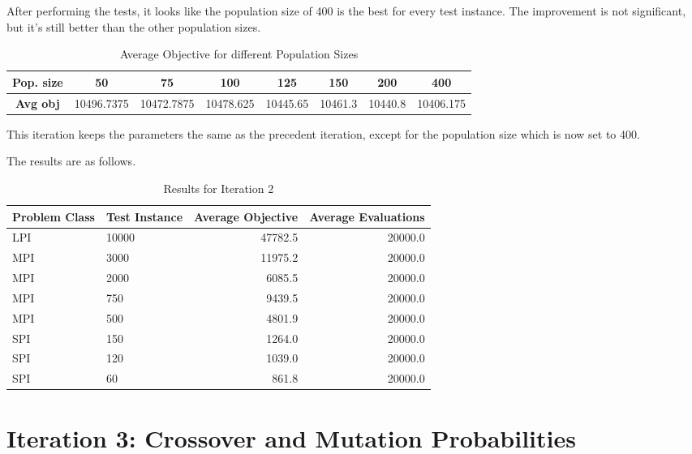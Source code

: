 After performing the tests, it looks like the population size of 400 is the best for every test instance. The improvement is not significant, but it's still better than the other population sizes.

\begin{table}[h!]
    \centering
    \begin{tabular}{|c|c c c c c c c|}
    \hline
    \textbf{Pop. size} & \textbf{50} & \textbf{75} & \textbf{100} & \textbf{125} & \textbf{150} & \textbf{200} & \textbf{400} \\
    \hline
    \textbf{Avg obj} & 10496.7375 & 10472.7875 & 10478.625 & 10445.65 & 10461.3 & 10440.8 & 10406.175 \\
    \hline
    \end{tabular}
    \caption{Average Objective for different Population Sizes}
    \label{table:gen_objective}
\end{table}

This iteration keeps the parameters the same as the precedent iteration, except for the population size which is now set to 400.

The results are as follows.

\begin{table}[h]
    \centering
    \begin{tabular}{|l l r r|}
        \hline
        \textbf{Problem Class} & \textbf{Test Instance} & \textbf{Average Objective} & \textbf{Average Evaluations} \\
        \hline
        LPI & 10000 & 47782.5 & 20000.0 \\
        MPI & 3000  & 11975.2  & 20000.0 \\
        MPI & 2000  & 6085.5   & 20000.0 \\
        MPI & 750   & 9439.5  & 20000.0 \\
        MPI & 500   & 4801.9   & 20000.0 \\
        SPI & 150   & 1264.0   & 20000.0 \\
        SPI & 120   & 1039.0    & 20000.0 \\
        SPI & 60    & 861.8   & 20000.0 \\
        \hline
    \end{tabular}
    \caption{Results for Iteration 2}
    \label{tab:gen_objective_summary}
\end{table}
\FloatBarrier

\section{Iteration 3: Crossover and Mutation Probabilities}

